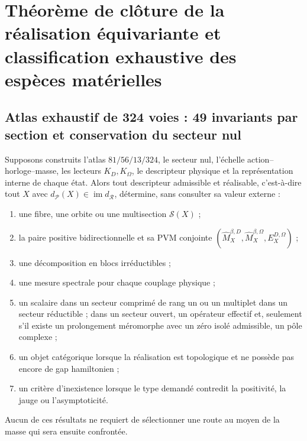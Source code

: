 \section{Théorème de clôture de la réalisation équivariante et classification exhaustive des espèces matérielles}

\subsection{Atlas exhaustif de 324 voies : 49 invariants par section et conservation du secteur nul}

\begin{theorem}
Supposons construits l'atlas \(81/56/13/324\), le secteur nul, l'échelle
action--horloge--masse, les lecteurs \(K_D,K_\Omega\), le descripteur physique et la
représentation interne de chaque état. Alors tout descripteur admissible et
réalisable, c'est-à-dire tout \(X\) avec
\(d_{\mathcal P}(X)\in\operatorname{im}d_{\mathcal R}\),
détermine, sans consulter sa valeur externe :
\begin{enumerate}
\item une fibre, une orbite ou une multisection \(\mathscr S(X)\) ;
\item la paire positive bidirectionnelle et sa PVM conjointe
      \((\widehat M_X^{\beta,D},\widehat M_X^{\beta,\Omega},
      E_X^{D,\Omega})\) ;
\item une décomposition en blocs irréductibles ;
\item une mesure spectrale pour chaque couplage physique ;
\item un scalaire dans un secteur comprimé de rang un ou un multiplet dans un
      secteur réductible ; dans un secteur ouvert, un opérateur effectif et, seulement s'il
      existe un prolongement méromorphe avec un zéro isolé admissible, un pôle
      complexe ;
\item un objet catégorique lorsque la réalisation est topologique et ne possède pas encore
      de gap hamiltonien ;
\item un critère d'inexistence lorsque le type demandé contredit
      la positivité, la jauge ou l'asymptoticité.
\end{enumerate}
Aucun de ces résultats ne requiert de sélectionner une route au moyen de la masse
qui sera ensuite confrontée.
\end{theorem}

